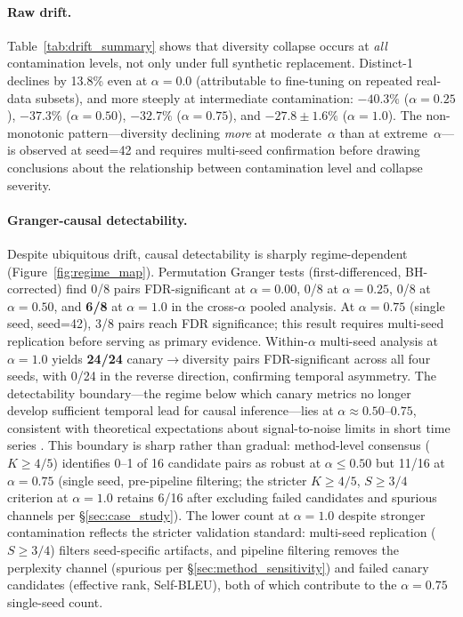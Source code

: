 \paragraph{Raw drift.}
Table~\ref{tab:drift_summary} shows that diversity collapse occurs at \emph{all} contamination levels, not only under full synthetic replacement.
Distinct-1 declines by 13.8\% even at $\alpha{=}0.0$ (attributable to fine-tuning on repeated real-data subsets), and more steeply at intermediate contamination: $-40.3\%$ ($\alpha{=}0.25$), $-37.3\%$ ($\alpha{=}0.50$), $-32.7\%$ ($\alpha{=}0.75$), and $-27.8{\pm}1.6\%$ ($\alpha{=}1.0$).
The non-monotonic pattern---diversity declining \emph{more} at moderate~$\alpha$ than at extreme~$\alpha$---is observed at seed=42 and requires multi-seed confirmation before drawing conclusions about the relationship between contamination level and collapse severity.

\paragraph{Granger-causal detectability.}
Despite ubiquitous drift, causal detectability is sharply regime-dependent (Figure~\ref{fig:regime_map}).
Permutation Granger tests (first-differenced, BH-corrected) find 0/8 pairs FDR-significant at $\alpha{=}0.00$, 0/8 at $\alpha{=}0.25$, 0/8 at $\alpha{=}0.50$, and \textbf{6/8} at $\alpha{=}1.0$ in the cross-$\alpha$ pooled analysis.
At $\alpha{=}0.75$ (single seed, seed=42), 3/8 pairs reach FDR significance; this result requires multi-seed replication before serving as primary evidence.
Within-$\alpha$ multi-seed analysis at $\alpha{=}1.0$ yields \textbf{24/24} canary$\to$diversity pairs FDR-significant across all four seeds, with 0/24 in the reverse direction, confirming temporal asymmetry.
The detectability boundary---the regime below which canary metrics no longer develop sufficient temporal lead for causal inference---lies at $\alpha \approx 0.50$--$0.75$, consistent with theoretical expectations about signal-to-noise limits in short time series \cite{boettiger2012limits}.
This boundary is sharp rather than gradual: method-level consensus ($K{\geq}4/5$) identifies 0--1 of 16 candidate pairs as robust at $\alpha{\leq}0.50$ but 11/16 at $\alpha{=}0.75$ (single seed, pre-pipeline filtering; the stricter $K{\geq}4/5$, $S{\geq}3/4$ criterion at $\alpha{=}1.0$ retains 6/16 after excluding failed candidates and spurious channels per \S\ref{sec:case_study}).
The lower count at $\alpha{=}1.0$ despite stronger contamination reflects the stricter validation standard: multi-seed replication ($S{\geq}3/4$) filters seed-specific artifacts, and pipeline filtering removes the perplexity channel (spurious per \S\ref{sec:method_sensitivity}) and failed canary candidates (effective rank, Self-BLEU), both of which contribute to the $\alpha{=}0.75$ single-seed count.

